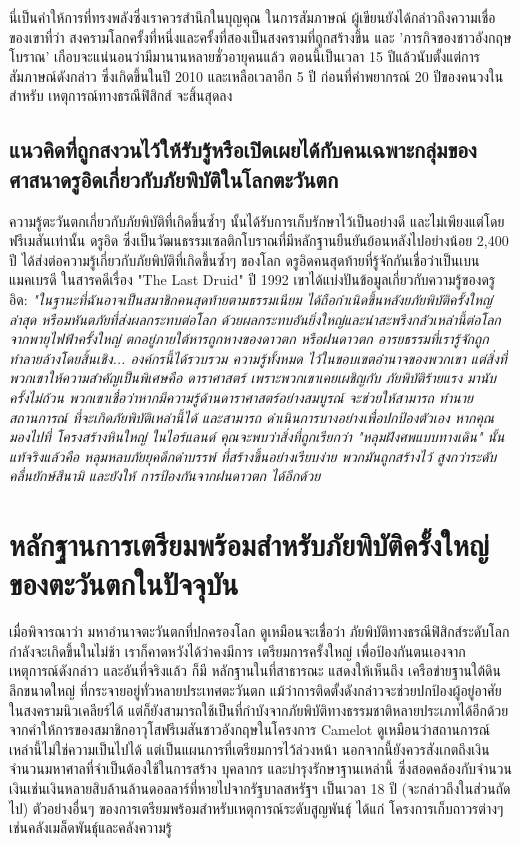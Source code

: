 \documentclass[10pt,twocolumn,letterpaper]{article}
\begin{document}
นี่เป็นคำให้การที่ทรงพลังซึ่งเราควรสำนึกในบุญคุณ ในการสัมภาษณ์ ผู้เขียนยังได้กล่าวถึงความเชื่อของเขาที่ว่า สงครามโลกครั้งที่หนึ่งและครั้งที่สองเป็นสงครามที่ถูกสร้างขึ้น และ 'ภารกิจของชาวอังกฤษโบราณ' เกือบจะแน่นอนว่ามีมานานหลายชั่วอายุคนแล้ว
ตอนนี้เป็นเวลา 15 ปีแล้วนับตั้งแต่การสัมภาษณ์ดังกล่าว ซึ่งเกิดขึ้นในปี 2010 และเหลือเวลาอีก 5 ปี ก่อนที่คำพยากรณ์ 20 ปีของคนวงในสำหรับ เหตุการณ์ทางธรณีฟิสิกส์ จะสิ้นสุดลง
\subsection{แนวคิดที่ถูกสงวนไว้ให้รับรู้หรือเปิดเผยได้กับคนเฉพาะกลุ่มของศาสนาดรูอิดเกี่ยวกับภัยพิบัติในโลกตะวันตก}

ความรู้ตะวันตกเกี่ยวกับภัยพิบัติที่เกิดขึ้นซ้ำๆ นั้นได้รับการเก็บรักษาไว้เป็นอย่างดี และไม่เพียงแต่โดยฟรีเมสันเท่านั้น ดรูอิด ซึ่งเป็นวัฒนธรรมเซลติกโบราณที่มีหลักฐานยืนยันย้อนหลังไปอย่างน้อย 2,400 ปี \cite{7} ได้ส่งต่อความรู้เกี่ยวกับภัยพิบัติที่เกิดขึ้นซ้ำๆ ของโลก ดรูอิดคนสุดท้ายที่รู้จักกันเชื่อว่าเป็นเบน แมคเบรดี ในสารคดีเรื่อง "The Last Druid" ปี 1992 เขาได้แบ่งปันข้อมูลเกี่ยวกับความรู้ของดรูอิด: \textit{"ในฐานะที่ฉันอาจเป็นสมาชิกคนสุดท้ายตามธรรมเนียม ได้ถือกำเนิดขึ้นหลังยภัยพิบัติครั้งใหญ่ล่าสุด หรือมหันตภัยที่ส่งผลกระทบต่อโลก ด้วยผลกระทบอันยิ่งใหญ่และน่าสะพรึงกลัวเหล่านี้ต่อโลก จากพายุไฟฟ้าครั้งใหญ่ ตกอยู่ภายใต้หารถูกหางของดาวตก หรือฝนดาวตก อารยธรรมที่เรารู้จักถูกทำลายล้างโดยสิ้นเชิง... องค์กรนี้ได้รวบรวม ความรู้ทั้งหมด ไว้ในขอบเขตอำนาจของพวกเขา แต่สิ่งที่พวกเขาให้ความสำคัญเป็นพิเศษคือ ดาราศาสตร์ เพราะพวกเขาเคยเผชิญกับ ภัยพิบัติร้ายแรง มานับครั้งไม่ถ้วน พวกเขาเชื่อว่าหากมีความรู้ด้านดาราศาสตร์อย่างสมบูรณ์ จะช่วยให้สามารถ ทำนายสถานการณ์ ที่จะเกิดภัยพิบัติเหล่านี้ได้ และสามารถ ดำเนินการบางอย่างเพื่อปกป้องตัวเอง หากคุณมองไปที่ โครงสร้างหินใหญ่ ในไอร์แลนด์ คุณจะพบว่าสิ่งที่ถูกเรียกว่า "หลุมฝังศพแบบทางเดิน" นั้น แท้จริงแล้วคือ หลุมหลบภัยยุคดึกดำบรรพ์ ที่สร้างขึ้นอย่างเรียบง่าย พวกมันถูกสร้างไว้ สูงกว่าระดับคลื่นยักษ์สึนามิ และยังให้ การป้องกันจากฝนดาวตก ได้อีกด้วย} \cite{8,9}

\section{หลักฐานการเตรียมพร้อมสำหรับภัยพิบัติครั้งใหญ่ของตะวันตกในปัจจุบัน}

เมื่อพิจารณาว่า มหาอำนาจตะวันตกที่ปกครองโลก ดูเหมือนจะเชื่อว่า ภัยพิบัติทางธรณีฟิสิกส์ระดับโลก กำลังจะเกิดขึ้นในไม่ช้า เราก็คาดหวังได้ว่าคงมีการ เตรียมการครั้งใหญ่ เพื่อป้องกันตนเองจากเหตุการณ์ดังกล่าว และอันที่จริงแล้ว ก็มี หลักฐานในที่สาธารณะ แสดงให้เห็นถึง เครือข่ายฐานใต้ดินลึกขนาดใหญ่ ที่กระจายอยู่ทั่วหลายประเทศตะวันตก แม้ว่าการติดตั้งดังกล่าวจะช่วยปกป้องผู้อยู่อาศัยในสงครามนิวเคลียร์ได้ แต่ก็ยังสามารถใช้เป็นที่กำบังจากภัยพิบัติทางธรรมชาติหลายประเภทได้อีกด้วย จากคำให้การของสมาชิกอาวุโสฟรีเมสันชาวอังกฤษในโครงการ Camelot \cite{4,6} ดูเหมือนว่าสถานการณ์เหล่านี้ไม่ใช่ความเป็นไปได้ แต่เป็นแผนการที่เตรียมการไว้ล่วงหน้า นอกจากนี้ยังควรสังเกตถึงเงินจำนวนมหาศาลที่จำเป็นต้องใช้ในการสร้าง บุคลากร และบำรุงรักษาฐานเหล่านี้ ซึ่งสอดคล้องกับจำนวนเงินเช่นเงินหลายสิบล้านล้านดอลลาร์ที่หายไปจากรัฐบาลสหรัฐฯ เป็นเวลา 18 ปี (จะกล่าวถึงในส่วนถัดไป) \cite{11,12,13} ตัวอย่างอื่นๆ ของการเตรียมพร้อมสำหรับเหตุการณ์ระดับสูญพันธุ์ ได้แก่ โครงการเก็บถาวรต่างๆ เช่นคลังเมล็ดพันธุ์และคลังความรู้
\end{document}

